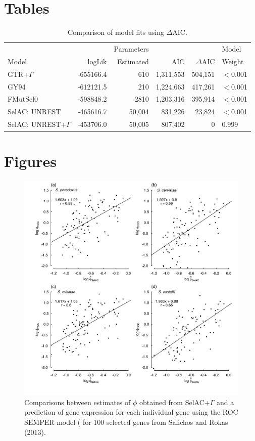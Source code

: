 \documentclass{article}
\newcommand{\DeltaAIC}{\ensuremath{\Delta\text{AIC}}\xspace}
\begin{document}
\section*{Tables}
  \begin{table}
    \begin{tabular}{lrrrrl}
      &          &Parameters &          &        & Model\\
      Model                 	& logLik   & Estimated &     AIC& \DeltaAIC&  Weight\\\hline
      GTR+$\Gamma$        		& -655166.4&        610& 1,311,553& 504,151&$<$0.001\\
      GY94                  	& -612121.5&        210& 1,224,663& 417,261&$<$0.001\\
      FMutSel0              		& -598848.2&       2810& 1,203,316& 395,914&$<$0.001\\
      SelAC: UNREST         	& -465616.7&       50,004&   831,226&  23,824&$<$0.001\\
      SelAC: UNREST+$\Gamma$ 	& -453706.0&       50,005&   807,402&       0& 0.999
    \end{tabular}
    \caption{Comparison of model fits using $\DeltaAIC$.}
    \label{table:modelFits}
\end{table}

\clearpage %

\section*{Figures}

\begin{figure}[H]
  \centering
  \includegraphics[width=0.9\linewidth]{FIGURE_1_SelACwG_vs_ROC_by_spp.pdf}
  \caption{Comparisons between estimates of $\phi$ obtained from SelAC+$\Gamma$ and a prediction of gene expression for each individual gene using the ROC SEMPER model (\citet{GilchristEtAl2015} for 100 selected genes from Salichos and Rokas (2013).
  } 
  \label{fig:PhivsROC}
\end{figure}
\end{document}
